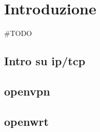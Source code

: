 
\chapter{Introduzione}
\setlength{\parskip}{1em}
\setlength{\parindent}{0em}
\renewcommand{\baselinestretch}{1.15}

\#TODO

\section{Intro su ip/tcp} 
\label{Scopo_e_analisi_del_progetto}


\section{openvpn}
\label{caratteristiche_vps}


\section{openwrt}
\label{caratteristiche_gateway}

